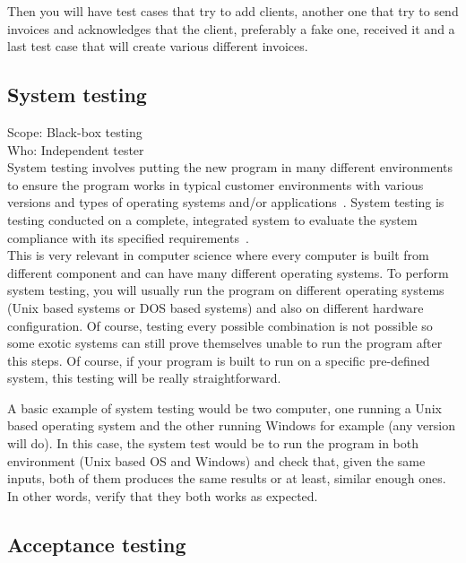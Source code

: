 \documentclass[12pt]{article}
\theoremstyle{definition}
\theoremstyle{definition}
\theoremstyle{remark}
\begin{document}
Then you will have test cases that try to add clients, another one that try to send invoices and acknowledges that the client, preferably a fake one, received it and a last test case that will create various different invoices.


\subsection{System testing}

Scope: Black-box testing\\
Who: Independent tester\\

System testing involves putting the new program in many different environments to ensure the program works in typical customer environments with various versions and types of operating systems and/or applications~\cite{Laurie.W:Black-box}. System testing is testing conducted on a complete, integrated system to evaluate the system compliance with its specified requirements~\cite{IEEEStd1990}.\\

This is very relevant in computer science where every computer is built from different component and can have many different operating systems. To perform system testing, you will usually run the program on different operating systems (Unix based systems or DOS based systems) and also on different hardware configuration. Of course, testing every possible combination is not possible so some exotic systems can still prove themselves unable to run the program after this steps. Of course, if your program is built to run on a specific pre-defined system, this testing will be really straightforward.

A basic example of system testing would be two computer, one running a Unix based operating system and the other running Windows for example (any version will do). In this case, the system test would be to run the program in both environment (Unix based OS and Windows) and check that, given the same inputs, both of them produces the same results or at least, similar enough ones. In other words, verify that they both works as expected.


\subsection{Acceptance testing}
\end{document}
